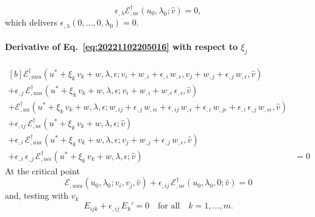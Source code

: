 \documentclass[12pt, final]{scrartcl}
\theoremstyle{definition}
\newcommand{\E}{\mathcal E}
\newcommand{\EE}{\mathcal E ^ \dagger}
\begin{document}
\begin{equation}
  \epsilon_{,\lambda} \EE_{,u\epsilon}(u_0, \lambda_0; \hat{v}) = 0,
\end{equation}
which delivers \(\epsilon_{,\lambda}(0, \ldots, 0, \lambda_0) = 0\).

\paragraph{Derivative of Eq.~\eqref{eq:20221102205016} with respect to \(\xi_j\)}
\begin{equation}
  \begin{aligned}[b]
    \EE_{,uuu}(u^\ast + \xi_k \, v_k + w, \lambda, \epsilon; v_i + w_{,i} + \epsilon_{,i} \,  w_{,\epsilon}, v_j + w_{,j} + \epsilon_{,j} \, w_{,\epsilon}, \hat{v})&\\
    + \epsilon_{,j} \, \EE_{,uu\epsilon}(u^\ast + \xi_k \, v_k + w, \lambda, \epsilon; v_i + w_{,i} + w_{,\epsilon} \, \epsilon_{,i}, \hat{v})&\\
    + \EE_{,uu}(u^\ast + \xi_k \, v_k + w, \lambda, \epsilon; w_{,ij} + \epsilon_{,j} \, w_{,i\epsilon} + \epsilon_{,ij} \, w_{,\epsilon} + \epsilon_{,i} \, w_{,j\epsilon} + \epsilon_{,i} \, \epsilon_{,j} \, w_{,\epsilon\epsilon} , \hat{v})&\\
    + \epsilon_{,ij} \, \EE_{,u\epsilon}(u^\ast + \xi_k \, v_k + w, \lambda, \epsilon; \hat{v})&\\
    + \epsilon_{,i} \, \EE_{,uu\epsilon}(u^\ast + \xi_k \, v_k + w, \lambda, \epsilon; v_j + w_{,j} + \epsilon_{,j} \, w_{,\epsilon}, \hat{v})&\\
    + \epsilon_{,i} \, \epsilon_{,j} \, \EE_{,u\epsilon\epsilon}(u^\ast + \xi_k \, v_k + w, \lambda, \epsilon; \hat{v}) &= 0
  \end{aligned}
\end{equation}
At the critical point
\begin{equation}
  \E_{,uuu}(u_0, \lambda_0; v_i, v_j, \hat{v}) + \epsilon_{,ij} \, \EE_{,u\epsilon}(u_0, \lambda_0, 0; \hat{v}) = 0
\end{equation}
and, testing with \(v_k\)
\begin{equation}
  E_{ijk} + \epsilon_{,ij} \, E_k' = 0 \quad \text{for all} \quad k = 1, \ldots, m.
\end{equation}
\end{document}
